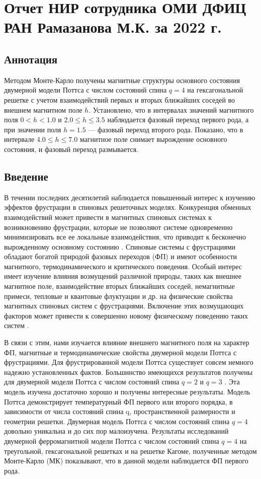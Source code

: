 \chapter{Отчет НИР сотрудника ОМИ ДФИЦ РАН Рамазанова М.К. за 2022 г.}


\section*{Аннотация}

Методом Монте-Карло получены магнитные структуры основного состояния двумерной модели Поттса с числом состояний спина $q = 4$ на гексагональной решетке с учетом взаимодействий первых и вторых ближайших соседей во внешнем магнитном поле $h$. Установлено, что в интервалах значений магнитного поля $0 < h < 1.0$ и $2.0 \leq h \leq 3.5$ наблюдается фазовый переход первого рода, а при значении поля $h = 1.5$ --- фазовый переход второго рода. Показано, что в интервале $4.0 \leq h \leq 7.0$ магнитное поле снимает вырождение основного состояния, и фазовый переход размывается.


\section*{Введение}

В течении последних десятилетий наблюдается повышенный интерес к изучению эффектов фрустрации в спиновых решеточных моделях. Конкуренция обменных взаимодействий может привести в магнитных спиновых системах к возникновению фрустрации, которые не позволяют системе одновременно минимизировать все ее локальные взаимодействия, что приводит к бесконечно вырожденному основному состоянию \cite{rmk-bib-1}. Спиновые системы с фрустрациями обладают богатой природой фазовых переходов (ФП) и имеют особенности магнитного, термодинамического и критического поведения. Особый интерес имеет изучение влияния возмущений различной природы, таких как внешнее магнитное поле, взаимодействие вторых ближайших соседей, немагнитные примеси, тепловые и квантовые флуктуации и др. на физические свойства магнитных спиновых систем с фрустрациями. Включение этих возмущающих факторов может привести к совершенно новому физическому поведению таких систем \cite{rmk-bib-2}.

В связи с этим, нами изучается влияние внешнего магнитного поля на характер ФП, магнитные и термодинамические свойства двумерной модели Поттса с фрустрациями. Для фрустрированной модели Поттса существует совсем немного надежно установленных фактов. Большинство имеющихся результатов получены для двумерной модели Поттса с числом состояний спина $q = 2$ и $q = 3$ \cite{rmk-bib-3}. Эта модель изучена достаточно хорошо и получены интересные результаты. Модель Поттса демонстрирует температурный ФП первого или второго порядка, в зависимости от числа состояний спина q, пространственной размерности и геометрии решетки. Двумерная модель Поттса с числом состояний спина $q = 4$ довольно уникальна и до сих пор малоизучена. Результаты исследований двумерной ферромагнитной модели Поттса с числом состояний спина $q = 4$ на треугольной, гексагональной решетках и на решетке Кагоме, полученные методом Монте-Карло (МК) показывают, что в данной модели наблюдается ФП первого рода.

